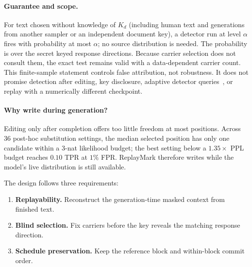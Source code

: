 \paragraph{Guarantee and scope.}
For text chosen without knowledge of $K_d$ (including human text and generations from another
sampler or an independent document key), a detector run at level $\alpha$ fires with probability
at most $\alpha$; no source distribution is needed. The probability is over the secret keyed response
directions. Because carrier selection does not consult them, the exact test remains valid with a
data-dependent carrier count. This finite-sample statement controls false attribution, not robustness.
It does not promise detection after editing, key disclosure, adaptive detector
queries~\citep{jovanovic2024stealing}, or replay with a numerically different checkpoint.

\paragraph{Why write during generation?}
Editing only after completion offers too little freedom at most positions. Across 36 post-hoc
substitution settings, the median selected position has only one candidate within a 3-nat
likelihood budget; the best setting below a $1.35\times$ PPL budget reaches $0.10$ TPR at $1\%$
FPR. ReplayMark therefore writes while the model's live distribution is still available.
\label{sec:posthoc}

The design follows three requirements:
\begin{enumerate}[leftmargin=1.6em,itemsep=0pt,topsep=1pt,label=\arabic*.]
\item \textbf{Replayability.} Reconstruct the generation-time masked context from finished text.
\item \textbf{Blind selection.} Fix carriers before the key reveals the matching response direction.
\item \textbf{Schedule preservation.} Keep the reference block and within-block commit order.
\end{enumerate}

